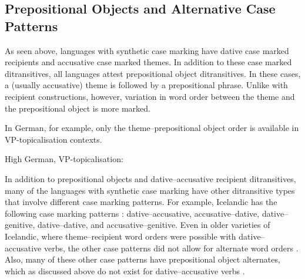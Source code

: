 \documentclass[11pt]{upenndiss}
\begin{document}
\subsection{Prepositional Objects and Alternative Case Patterns}
As seen above, languages with synthetic case marking have dative case marked recipients and accusative case marked themes. In addition to these case marked ditransitives, all languages attest prepositional object ditransitives. In these cases, a (usually accusative) theme is followed by a prepositional phrase. Unlike with recipient constructions, however, variation in word order between the theme and the prepositional object is more marked.

In German, for example, only the theme--prepositional object order is available in VP-topicalisation contexts.

\begin{exe}
	\ex High German, VP-topicalisation:
	\begin{xlist}
	\end{xlist}
\end{exe}

In addition to prepositional objects and dative--accusative recipient ditransitives, many of the languages with synthetic case marking have other ditransitive types that involve different case marking patterns. For example, Icelandic has the following case marking patterns \citep[4.149]{Thrainsson.2007}: dative--accusative, accusative--dative, dative--genitive, dative--dative, and accusative--genitive. Even in older varieties of Icelandic, where theme--recipient word orders were possible with dative--accusative verbs, the other case patterns did not allow for alternate word orders \citep{Ottosson.1991}. Also, many of these other case patterns have prepositional object alternates, which as discussed above do not exist for dative--accusative verbs \citep{Ottosson.1991,Thrainsson.2007}.
\end{document}
